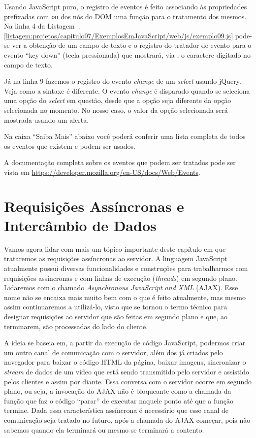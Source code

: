 Usando JavaScript puro, o registro de eventos é feito associando às propriedades prefixadas com \texttt{on} dos nós do DOM uma função para o tratamento dos mesmos. Na linha 4 da Listagem~\thechapter.\ref{listagem:projetos/capitulo07/ExemplosEmJavaScript/web/js/exemplo09.js} pode-se ver a obtenção de um campo de texto e o registro do tratador de evento para o evento ``key down'' (tecla pressionada) que mostrará, via , o caractere digitado no campo de texto.

Já na linha 9 fazemos o registro do evento \textit{change} de um \textit{select} usando jQuery. Veja como a sintaxe é diferente. O evento \textit{change} é disparado quando se seleciona uma opção do \textit{select} em questão, desde que a opção seja diferente da opção selecionada no momento. No nosso caso, o valor da opção selecionada será mostrada usando um alerta.

Na caixa ``Saiba Mais'' abaixo você poderá conferir uma lista completa de todos os eventos que existem e podem ser usados.

\begin{saibaMais}
    A documentação completa sobre os eventos que podem ser tratados pode ser vista em  \url{https://developer.mozilla.org/en-US/docs/Web/Events}.
\end{saibaMais}



\section{Requisições Assíncronas e Intercâmbio de Dados}

Vamos agora lidar com mais um tópico importante deste capítulo em que trataremos as requisições assíncronas ao servidor. A linguagem JavaScript atualmente possui diversas funcionalidades e construções para trabalharmos com requisições assíncronas e com linhas de execução (\textit{threads}) em segundo plano. Lidaremos com o chamado \textit{Asynchronous JavaScript and XML} (AJAX). Esse nome não se encaixa mais muito bem com o que é feito atualmente, mas mesmo assim continuaremos a utilizá-lo, visto que se tornou o termo técnico para designar requisições ao servidor que são feitas em segundo plano e que, ao terminarem, são processadas do lado do cliente.

A ideia se baseia em, a partir da execução de código JavaScript, podermos criar um outro canal de comunicação com o servidor, além dos já criados pelo navegador para baixar o código HTML da página, baixar imagens, sincronizar o \textit{stream} de dados de um vídeo que está sendo transmitido pelo servidor e assistido pelos clientes e assim por diante. Essa conversa com o servidor ocorre em segundo plano, ou seja, a invocação do AJAX não é bloqueante como a chamada da função  que faz o código ``parar'' de executar naquele ponto até que a função termine. Dada essa característica assíncrona é necessário que esse canal de comunicação seja tratado no futuro, após a chamada do AJAX começar, pois não sabemos quando ela terminará ou mesmo se terminará a contento.

